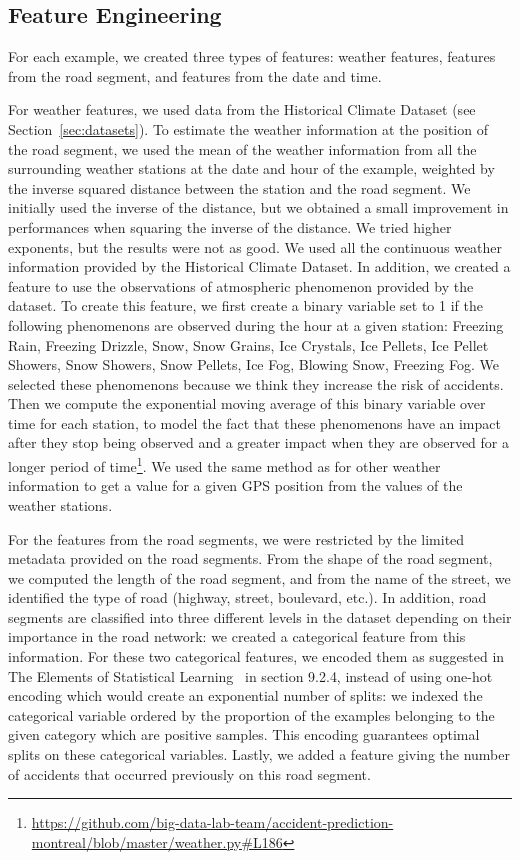 \documentclass[conference]{IEEEtran}
\begin{document}
\subsection{Feature Engineering}

For each example, we created three types of features: weather features,
features from the road segment, and features from the date and time.

For weather features, we used data from the Historical Climate Dataset (see Section~\ref{sec:datasets}).
To estimate the weather information at the position of the road
segment, we used the mean of the weather information from all the
surrounding weather stations at the date and hour of the example, weighted
by the inverse squared distance between the station and the
road segment. We initially used the inverse of the distance, but we
obtained a small improvement in performances when squaring the inverse of
the distance. We tried higher exponents, but the results were not as good.
We used all the continuous weather information provided
by the Historical Climate Dataset. In addition, we created a feature to use
the observations of atmospheric phenomenon provided by the dataset.
To create this feature, we first create a binary variable set to 1 if the
following phenomenons are observed during the hour at a given station:
Freezing Rain, Freezing Drizzle, Snow, Snow Grains, Ice Crystals, Ice Pellets,
Ice Pellet Showers, Snow Showers, Snow Pellets, Ice Fog, Blowing Snow, Freezing
Fog. We selected these phenomenons because we think they increase the risk of
accidents. Then we compute the exponential moving average of this binary
variable over time for each station, to model the fact that
these phenomenons have an impact after they stop being observed and a greater
impact when they are observed for a longer period of time\footnote{\url{https://github.com/big-data-lab-team/accident-prediction-montreal/blob/master/weather.py\#L186}}. We used the
same method as for other weather information to get a value for a given 
GPS position from the values of the weather stations.

For the features from the road segments, we were restricted by the limited
metadata provided on the road segments. From the shape of the road segment,
we computed the length of the road segment, and from the name of the
street, we identified the type of road (highway, street, boulevard, etc.).
In addition, road segments are classified into three different levels in
the dataset depending on their importance in the road network: we created a
categorical feature from this information. For these two categorical
features, we encoded them as suggested in The Elements of Statistical
Learning~\cite{elementsofstat} in section 9.2.4, instead of using one-hot
encoding which would create an exponential number of splits: we indexed the
categorical variable ordered by the proportion of the examples belonging to
the given category which are positive samples. This encoding guarantees 
optimal splits on these categorical variables. Lastly, we added a
feature giving the number of accidents that occurred previously on this
road segment.
\end{document}
